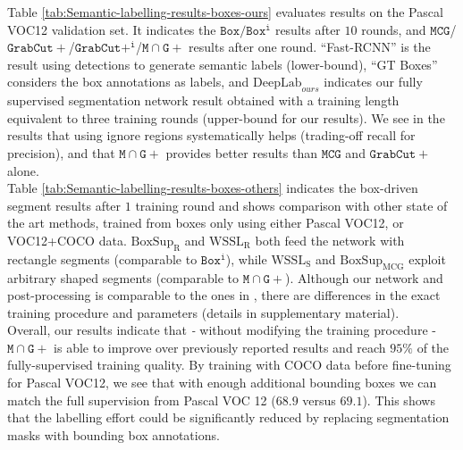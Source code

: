\documentclass[10pt,english,british,twocolumn]{article}
\begin{document}
Table \ref{tab:Semantic-labelling-results-boxes-ours} evaluates results
on the Pascal VOC12 validation set. It indicates the $\mathtt{Box}/\mathtt{Box^{i}}$
results after $10$ rounds, and \texttt{$\mathtt{MCG}$}/$\mathtt{GrabCut+}$/$\mathtt{GrabCut+^{i}}$/$\mathtt{M}\cap\mathtt{G+}$
results after one round. ``Fast-RCNN'' is the result using detections
\cite{Girshick2015IccvFastRCNN} to generate semantic labels (lower-bound),
``GT Boxes'' considers the box annotations as labels, and $\text{DeepLab}_{ours}$
indicates our fully supervised segmentation network result obtained
with a training length equivalent to three training rounds (upper-bound
for our results). We see in the results that using ignore regions
systematically helps (trading-off recall for precision), and that
$\mathtt{M}\cap\mathtt{G+}$ provides better results than \texttt{$\mathtt{MCG}$}
and $\mathtt{GrabCut+}$ alone.\\
Table \ref{tab:Semantic-labelling-results-boxes-others} indicates
the box-driven segment results after $1$ training round and shows
comparison with other state of the art methods, trained from boxes
only using either Pascal VOC12, or VOC12+COCO data. $\mathrm{BoxSup_{R}}$
and $\mathrm{WSSL_{R}}$ both feed the network with rectangle segments
(comparable to $\mathtt{Box^{i}}$), while $\mathrm{WSSL_{S}}$ and
$\mathrm{BoxSup_{MCG}}$ exploit arbitrary shaped segments (comparable
to $\mathtt{M}\cap\mathtt{G+}$). Although our network and post-processing
is comparable to the ones in \cite{Dai2015Iccv,Papandreou2015Iccv},
there are differences in the exact training procedure and parameters
(details in supplementary material).\\
Overall, our results indicate that \emph{- }without modifying the
training procedure - $\mathtt{M}\cap\mathtt{G+}$ is able to improve
over previously reported results and reach $95\%$ of the fully-supervised
training quality. By training with COCO data \cite{Lin2014EccvCoco}
before fine-tuning for Pascal VOC12, we see that with enough additional
bounding boxes we can match the full supervision from Pascal VOC 12
($68.9$ versus $69.1$). This shows that the labelling effort could
be significantly reduced by replacing segmentation masks with bounding
box annotations.
\end{document}
